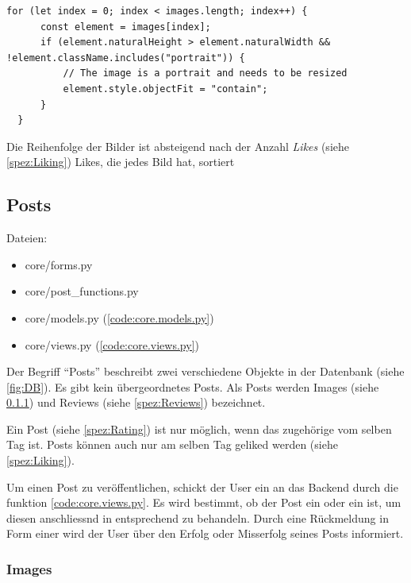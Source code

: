 \begin{lstlisting}
for (let index = 0; index < images.length; index++) {
      const element = images[index];
      if (element.naturalHeight > element.naturalWidth && !element.className.includes("portrait")) {
          // The image is a portrait and needs to be resized
          element.style.objectFit = "contain";
      }
  }
\end{lstlisting}

Die Reihenfolge der Bilder ist absteigend nach der Anzahl \emph{Likes} (siehe
\ref{spez:Liking}) Likes, die jedes Bild hat, sortiert


\subsection{Posts} \label{spez:Posts}

Dateien:
\begin{itemize}
    \item core/forms.py 
    \item core/post\_functions.py
    \item core/models.py (\ref{code:core.models.py})
    \item core/views.py (\ref{code:core.views.py})
\end{itemize}

Der Begriff ``Posts'' beschreibt zwei verschiedene Objekte in der Datenbank (siehe
\ref{fig:DB}). Es gibt kein übergeordnetes Posts. Als Posts werden Images
(siehe \ref{spez:Images}) und Reviews (siehe \ref{spez:Reviews}) bezeichnet.

Ein Post (siehe \ref{spez:Rating}) ist nur möglich, wenn das zugehörige
 vom selben Tag ist. Posts können auch nur am selben Tag geliked
werden (siehe \ref{spez:Liking}).

Um einen Post zu veröffentlichen, schickt der User ein  an
das Backend durch die  funktion 
\ref{code:core.views.py}. Es wird bestimmt, ob der Post ein  oder
ein  ist, um diesen anschliessnd in 
entsprechend zu behandeln. Durch eine Rückmeldung in Form einer  wird der User über den Erfolg oder Misserfolg seines Posts informiert.

\subsubsection{Images} \label{spez:Images}

